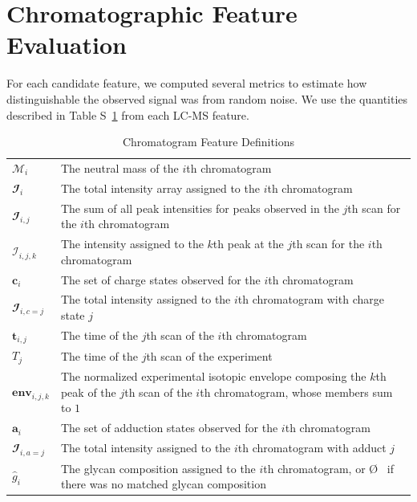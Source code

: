\section{Chromatographic Feature Evaluation}\label{sec:feature_evaluation}
    For each candidate feature, we computed several metrics to estimate how distinguishable
    the observed signal was from random noise. We use the quantities described in Table
    S~\ref{tbl:chromatogram_feature_definitions} from each LC-MS feature.

    \renewcommand{\arraystretch}{1.5}
    \begin{table}[!h]
        \caption{Chromatogram Feature Definitions}\label{tbl:chromatogram_feature_definitions}
        \centering
        \begin{tabular}{l | p{9cm}}
            \hline
            $\mathcal{M}_i$          & The neutral mass of the $i$th chromatogram\\
            $\mathbfcal{I}_i$        & The total intensity array assigned to the $i$th chromatogram\\
            $\mathbfcal{I}_{i, j}$   & The sum of all peak intensities for peaks observed in
                                       the $j$th scan for the $i$th chromatogram\\
            $\mathcal{I}_{i, j, k}$  & The intensity assigned to the $k$th peak at the $j$th
                                       scan for the $i$th chromatogram\\
            $\mathbf{c}_i$           & The set of charge states observed for the $i$th chromatogram\\
            $\mathbfcal{I}_{i, c=j}$ & The total intensity assigned to the $i$th chromatogram
                                       with charge state $j$\\
            $\mathbf{t}_{i, j}$      & The time of the $j$th scan of the $i$th chromatogram\\
            $T_j$                    & The time of the $j$th scan of the experiment\\
            $\textbf{env}_{i, j, k}$ & The normalized experimental isotopic envelope composing
                                       the $k$th peak of the $j$th scan of the $i$th chromatogram,
                                       whose members sum to $1$\\
            $\mathbf{a}_i$           & The set of adduction states observed for the $i$th chromatogram\\
            $\mathbfcal{I}_{i, a=j}$ & The total intensity assigned to the $i$th
                                       chromatogram with adduct $j$\\
            ${\hat g}_i$             & The glycan composition assigned to the $i$th chromatogram, or \O
                                       \ if there was no matched glycan composition
        \end{tabular}
    \end{table}
    \renewcommand{\arraystretch}{1.0}

